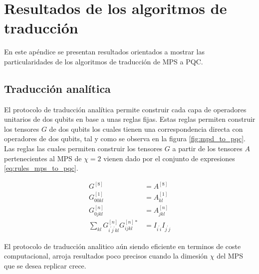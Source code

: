 \newpage

\section{Resultados de los algoritmos de traducción}
\label{apendix:mps_to_pqc}

En este apéndice se presentan resultados orientados a mostrar las particularidades de los algoritmos de traducción de MPS a PQC.

\subsection{Traducción analítica}

El protocolo de traducción analítica permite construir cada capa de operadores unitarios de dos qubits en base a unas reglas fijas. Estas reglas permiten construir los tensores $G$ de dos qubits los cuales tienen una correspondencia directa con operadores de dos qubits, tal y como se observa en la figura \ref{fig:mpd_to_pqc}. Las reglas las cuales permiten construir los tensores $G$ a partir de los tensores $A$ pertenecientes al MPS de $\chi =2$ vienen dado por el conjunto de expresiones \ref{eq:rules_mps_to_pqc}.

\begin{equation}
\begin{aligned}
G^{[8]} &= A^{[8]} \\
G_{00kl}^{[1]} &= A_{kl}^{[1]} \\
G_{0jkl}^{[n]} &= A_{jkl}^{[n]} \\
\sum_{kl} G^{[n]}_{i^{'} j^{'} k l} G^{[n]*}_{i j k l} &= I_{i^{'} i} I_{j^{'} j}
\end{aligned}
\label{eq:rules_mps_to_pqc}
\end{equation}

El protocolo de traducción analitico aún siendo eficiente en terminos de coste computacional, arroja resultados poco precisos cuando la dimesión $\chi$ del MPS que se desea replicar crece.


